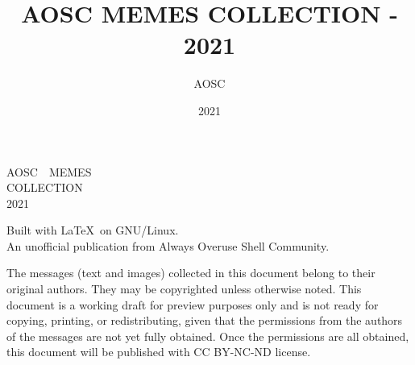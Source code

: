 \documentclass[10pt,a4paper]{report}
\title{AOSC MEMES COLLECTION - 2021}
\author{AOSC}
\date{2021}
\begin{document}
\begin{titlepage}
	\leavevmode
	\vskip 50mm
	\begin{center}
        \rmfamily{}
		\parbox{75mm}{
            \center\rmfamily{}\Huge\baselineskip=40pt
            A\hfill O\hfill S\hfill C~~\hfill M\hfill E\hfill M\hfill E\hfill S\\
            C\hfill O\hfill L\hfill L\hfill E\hfill C\hfill T\hfill I\hfill O\hfill N\\
            2021
        }\par
		\vfill
        \sffamily
		\normalsize
        Built with \LaTeX~on GNU/Linux.\\
        An unofficial publication from Always Overuse Shell Community.
	\end{center}
\end{titlepage}




\begin{multicols*}{2}
	
\end{multicols*}




\clearpage
\leavevmode
\vfill
\small
\sffamily
The messages (text and images) collected in this document belong to their original authors.
They may be copyrighted unless otherwise noted.
This document is a working draft for preview purposes only and is not ready for copying, printing, or redistributing,
given that the permissions from the authors of the messages are not yet fully obtained.
Once the permissions are all obtained, this document will be published with CC BY-NC-ND license.
\end{document}
